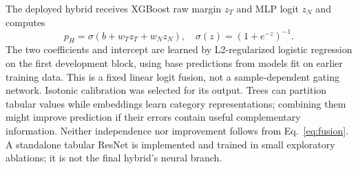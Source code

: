 \documentclass[conference]{IEEEtran}
\begin{document}
The deployed hybrid receives XGBoost raw margin $z_T$ and MLP logit $z_N$ and computes
\begin{equation}
 p_H=\sigma(b+w_T z_T+w_N z_N),\quad \sigma(z)=(1+e^{-z})^{-1}.
\label{eq:fusion}\end{equation}
The two coefficients and intercept are learned by L2-regularized logistic regression on the first development block, using base predictions from models fit on earlier training data. This is a fixed linear logit fusion, not a sample-dependent gating network. Isotonic calibration was selected for its output. Trees can partition tabular values while embeddings learn category representations; combining them might improve prediction if their errors contain useful complementary information. Neither independence nor improvement follows from Eq.~\eqref{eq:fusion}. A standalone tabular ResNet is implemented and trained in small exploratory ablations; it is not the final hybrid's neural branch.
\end{document}
